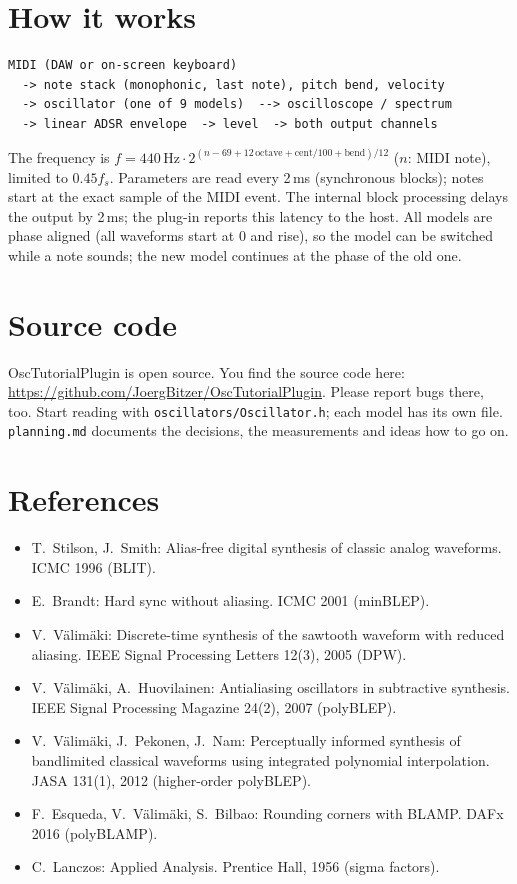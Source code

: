 \documentclass[11pt]{article}
\newcommand{\sourceurl}{https://github.com/JoergBitzer/OscTutorialPlugin}
\begin{document}
\section{How it works}
\begin{verbatim}
MIDI (DAW or on-screen keyboard)
  -> note stack (monophonic, last note), pitch bend, velocity
  -> oscillator (one of 9 models)  --> oscilloscope / spectrum
  -> linear ADSR envelope  -> level  -> both output channels
\end{verbatim}
The frequency is $f = 440\,\text{Hz} \cdot 2^{(n - 69 + 12\,\text{octave} + \text{cent}/100 + \text{bend})/12}$
($n$: MIDI note), limited to $0.45 f_s$. Parameters are read every 2\,ms (synchronous blocks); notes
start at the exact sample of the MIDI event. The internal block processing delays the output by 2\,ms;
the plug-in reports this latency to the host. All models are phase aligned (all waveforms start at 0
and rise), so the model can be switched while a note sounds; the new model continues at the phase of
the old one.

\section{Source code}
OscTutorialPlugin is open source. You find the source code here:\newline
\url{\sourceurl}. Please report bugs there, too. Start reading with \texttt{oscillators/Oscillator.h};
each model has its own file. \texttt{planning.md} documents the decisions, the measurements and ideas
how to go on.

\section{References}
\begin{itemize}
\item T.~Stilson, J.~Smith: Alias-free digital synthesis of classic analog waveforms. ICMC 1996 (BLIT).
\item E.~Brandt: Hard sync without aliasing. ICMC 2001 (minBLEP).
\item V.~Välimäki: Discrete-time synthesis of the sawtooth waveform with reduced aliasing. IEEE Signal
  Processing Letters 12(3), 2005 (DPW).
\item V.~Välimäki, A.~Huovilainen: Antialiasing oscillators in subtractive synthesis. IEEE Signal
  Processing Magazine 24(2), 2007 (polyBLEP).
\item V.~Välimäki, J.~Pekonen, J.~Nam: Perceptually informed synthesis of bandlimited classical waveforms
  using integrated polynomial interpolation. JASA 131(1), 2012 (higher-order polyBLEP).
\item F.~Esqueda, V.~Välimäki, S.~Bilbao: Rounding corners with BLAMP. DAFx 2016 (polyBLAMP).
\item C.~Lanczos: Applied Analysis. Prentice Hall, 1956 (sigma factors).
\end{itemize}
\end{document}
